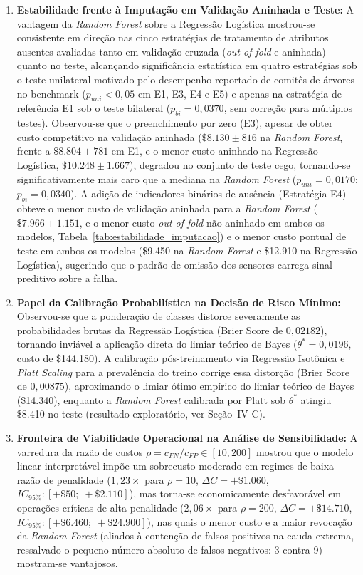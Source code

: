 \documentclass[conference]{IEEEtran}
\begin{document}
\begin{enumerate}
    \item \textbf{Estabilidade frente à Imputação em Validação Aninhada e Teste:} A vantagem da \textit{Random Forest} sobre a Regressão Logística mostrou-se consistente em direção nas cinco estratégias de tratamento de atributos ausentes avaliadas tanto em validação cruzada (\textit{out-of-fold} e aninhada) quanto no teste, alcançando significância estatística em quatro estratégias sob o teste unilateral motivado pelo desempenho reportado de comitês de árvores no benchmark ($p_{uni} < 0{,}05$ em E1, E3, E4 e E5) e apenas na estratégia de referência E1 sob o teste bilateral ($p_{bi} = 0{,}0370$, sem correção para múltiplos testes). Observou-se que o preenchimento por zero (E3), apesar de obter custo competitivo na validação aninhada ($\$8.130 \pm 816$ na \textit{Random Forest}, frente a $\$8.804 \pm 781$ em E1, e o menor custo aninhado na Regressão Logística, $\$10.248 \pm 1.667$), degradou no conjunto de teste cego, tornando-se significativamente mais caro que a mediana na \textit{Random Forest} ($p_{uni} = 0{,}0170$; $p_{bi} = 0{,}0340$). A adição de indicadores binários de ausência (Estratégia E4) obteve o menor custo de validação aninhada para a \textit{Random Forest} ($\$7.966 \pm 1.151$, e o menor custo \textit{out-of-fold} não aninhado em ambos os modelos, Tabela~\ref{tab:estabilidade_imputacao}) e o menor custo pontual de teste em ambos os modelos (\$9.450 na \textit{Random Forest} e \$12.910 na Regressão Logística), sugerindo que o padrão de omissão dos sensores carrega sinal preditivo sobre a falha.
    \item \textbf{Papel da Calibração Probabilística na Decisão de Risco Mínimo:} Observou-se que a ponderação de classes distorce severamente as probabilidades brutas da Regressão Logística (Brier Score de $0{,}02182$), tornando inviável a aplicação direta do limiar teórico de Bayes ($\theta^* = 0{,}0196$, custo de \$144.180). A calibração pós-treinamento via Regressão Isotônica e \textit{Platt Scaling} para a prevalência do treino corrige essa distorção (Brier Score de $0{,}00875$), aproximando o limiar ótimo empírico do limiar teórico de Bayes (\$14.340), enquanto a \textit{Random Forest} calibrada por Platt sob $\theta^*$ atingiu \$8.410 no teste (resultado exploratório, ver Seção~IV-C).
    \item \textbf{Fronteira de Viabilidade Operacional na Análise de Sensibilidade:} A varredura da razão de custos $\rho = c_{FN}/c_{FP} \in [10, 200]$ mostrou que o modelo linear interpretável impõe um sobrecusto moderado em regimes de baixa razão de penalidade ($1{,}23\times$ para $\rho = 10$, $\Delta C = +\$1.060$, $IC_{95\%}: [+\$50;\; +\$2.110]$), mas torna-se economicamente desfavorável em operações críticas de alta penalidade ($2{,}06\times$ para $\rho = 200$, $\Delta C = +\$14.710$, $IC_{95\%}: [+\$6.460;\; +\$24.900]$), nas quais o menor custo e a maior revocação da \textit{Random Forest} (aliados à contenção de falsos positivos na cauda extrema, ressalvado o pequeno número absoluto de falsos negativos: 3 contra 9) mostram-se vantajosos.
\end{enumerate}
\end{document}
